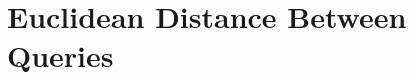 \documentclass[12pt]{report}
\theoremstyle{remark}
\theoremstyle{definition}
\theoremstyle{definition}
\theoremstyle{definition}
\begin{document}
\section{Euclidean Distance Between Queries}
\label{querydistance}

\newpage
{}

% 
% 
\end{document}
